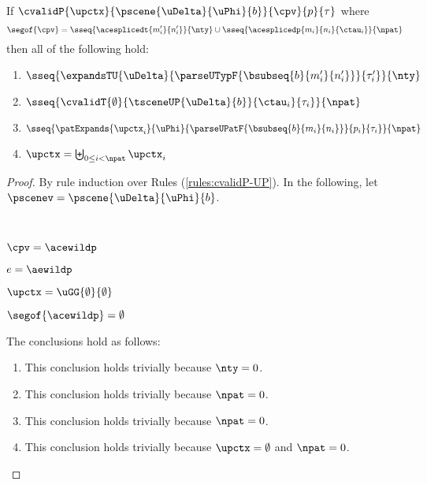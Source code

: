 \begin{grayparbox}
\begin{lemma}
\label{lemma:proto-pattern-expansion-decomposition-S}
If $\cvalidP{\upctx}{\pscene{\uDelta}{\uPhi}{b}}{\cpv}{p}{\tau}$ where  
\[ 
\segof{\cpv} = \sseq{\acesplicedt{m'_i}{n'_i}}{\nty} \cup \sseq{\acesplicedp{m_i}{n_i}{\ctau_i}}{\npat}
\]
then all of the following hold:
\begin{enumerate}
    \item $\sseq{
          \expandsTU{\uDelta}
          {
            \parseUTypF{\bsubseq{b}{m'_i}{n'_i}}
          }{\tau'_i}
        }{\nty}$
    \item $\sseq{
      \cvalidT{\emptyset}{
        \tsceneUP
          {\uDelta}{b}
      }{
        \ctau_i
      }{\tau_i}
    }{\npat}$
    \item $\sseq{
      \patExpands
        {\upctx_i}
        {\uPhi}
        {\parseUPatF{\bsubseq{b}{m_i}{n_i}}}
        {p_i}
        {\tau_i}
    }{\npat}$
  \item $\upctx = \biguplus_{0 \leq i < \npat} \upctx_i$
\end{enumerate}
\end{lemma}
\begin{proof} By rule induction over Rules (\ref{rules:cvalidP-UP}). In the following, let $\pscenev=\pscene{\uDelta}{\uPhi}{b}$.
\begin{byCases}
  \item[\text{(\ref{rule:cvalidP-UP-wild})}] ~
    \begin{pfsteps*}
      \item $\cpv=\acewildp$ 
      \item $e = \aewildp$ 
      \item $\upctx = \uGG{\emptyset}{\emptyset}$ 
      \item $\segof{\acewildp} = \emptyset$ 
    \end{pfsteps*}
    The conclusions hold as follows:
    \begin{enumerate}
      \item This conclusion holds trivially because $\nty=0$.
      \item This conclusion holds trivially because $\npat=0$.
      \item This conclusion holds trivially because $\npat=0$.
      \item This conclusion holds trivially because $\upctx=\emptyset$ and $\npat=0$.
    \end{enumerate}

\end{byCases}
\end{proof}
\end{grayparbox}
